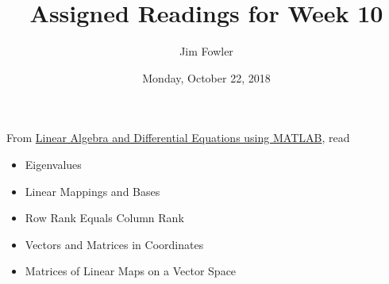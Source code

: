 \documentclass{homework}
\author{Jim Fowler}
\title{Assigned Readings for Week 10}
\date{Monday, October 22, 2018}
\begin{document}
\maketitle

From \href{/courses/43735/files/folder/textbooks}{Linear Algebra and Differential Equations using MATLAB}, read 
\begin{itemize}
\item {} Eigenvalues
\item {} Linear Mappings and Bases
\item {} Row Rank Equals Column Rank
\item {} Vectors and Matrices in Coordinates
\item {} Matrices of Linear Maps on a Vector Space
\end{itemize}
\end{document}
